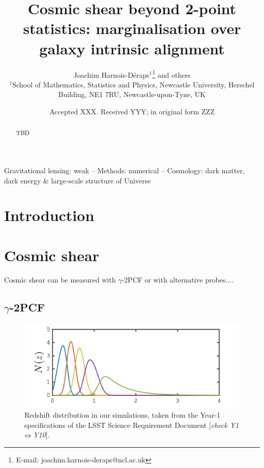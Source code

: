 \documentclass[useAMS,usenatbib]{mn2e}
\title[Lensing beyond 2pt: accounting for IA]{Cosmic shear beyond 2-point statistics: marginalisation over galaxy intrinsic alignment}
\author[J. Harnois-D\'{e}raps et al.]{Joachim Harnois-D\'{e}raps$^{1}$\thanks{E-mail: joachim.harnois-deraps@ncl.ac.uk} and others
\\
$^{1}$School of Mathematics, Statistics and Physics, Newcastle University, Herschel Building, NE1 7RU, Newcastle-upon-Tyne, UK\\
}
\date{Accepted XXX. Received YYY; in original form ZZZ}
\begin{document}
\label{firstpage}
\maketitle

\begin{abstract}
TBD
\end{abstract}

\begin{keywords}
Gravitational lensing: weak -- Methods: numerical -- Cosmology: dark matter, dark energy \& large-scale structure of Universe 
\end{keywords}



  
\section{Introduction}
\label{sec:intro}

\section{Cosmic shear}
\label{sec:theory}

Cosmic shear can be measured with $\gamma$-2PCF or with alternative probes....

\subsection{$\gamma$-2PCF}
\label{subsec:wl-th}


\begin{figure}
\includegraphics[width=\columnwidth]{graphs/Nz}
\caption{Redshift distribution in our simulations, taken from the Year-1 specifications of the LSST Science Requirement Document \citep{LSST-SRD} {[\it check Y1 vs Y10}].}
\label{fig:Nz}
\end{figure}
\end{document}
